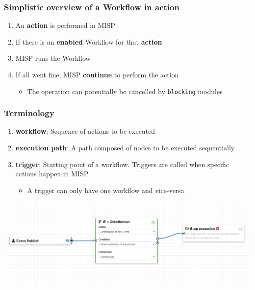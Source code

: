 \begin{frame}
    \frametitle{Simplistic overview of a Workflow in action}
    \begin{enumerate}
        \item An \textbf{action} is performed in MISP
        \item If there is an \textbf{enabled} Workflow for that \textbf{action}
        \item MISP runs the Workflow
        \item If all went fine, MISP \textbf{continue} to perform the action
        \begin{itemize}
            \item The operation can potentially be cancelled by \texttt{blocking} modules
        \end{itemize}
    \end{enumerate}
\end{frame}

\begin{frame}
    \frametitle{Terminology}
    \begin{enumerate}
        \item \textbf{workflow}: Sequence of actions to be executed
        \item \textbf{execution path}: A path composed of nodes to be executed sequentially
        \item \textbf{trigger}: Starting point of a workflow. Triggers are called when specific actions happen in MISP
        \begin{itemize}
            \item A trigger can only have one workflow and vice-versa
        \end{itemize}
    \end{enumerate}
    \begin{center}
        \includegraphics[width=1.0\linewidth]{pictures/simple-workflow.png}
    \end{center}
\end{frame}

